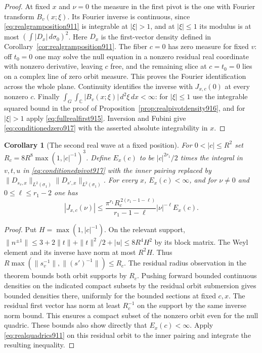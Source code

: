\documentclass[a4paper,11pt]{article}
\newtheorem{corollary}[proposition]{Corollary}
\theoremstyle{definition}
\theoremstyle{remark}
\numberwithin{equation}{section}
\begin{document}
\begin{proof}
At fixed \(x\) and \(\nu=0\) the measure in the first pivot
is the one with Fourier transform \(B_v(x;\xi)\). Its
Fourier inverse is continuous, since \eqref{eq:realgramposition911}
is integrable at \(|\xi|>1\), and at \(|\xi|\le1\) its
modulus is at most \((\int |D_x|\,d\sigma_0)^2\).
Here \(D_x\) is the first-vector density defined in
Corollary~\ref{cor:realgramposition911}. The fiber \(c=0\)
has zero measure for fixed \(v\): off \(t_0=0\) one may
solve the null equation in a nonzero residual real coordinate
with nonzero derivative, leaving \(c\) free, and the remaining
slice at \(c=t_0=0\) lies on a complex line of zero orbit
measure. This proves the Fourier identification across the
whole plane. Continuity identifies the inverse with
\(J_{x,c}(0)\) at every nonzero \(c\). Finally
\(\int_G\int_{\mathbb C}|B_v(x;\xi)|\,d^2\xi\,dx<\infty\):
for \(|\xi|\le1\) use the integrable squared bound in the
proof of Proposition~\ref{prop:realpivotdensity916}, and for
\(|\xi|>1\) apply \eqref{eq:fullrealfirst915}. Inversion and
Fubini give \eqref{eq:conditionedzero917} with the asserted
absolute integrability in \(x\).
\end{proof}

\begin{corollary}[The second real wave at a fixed position]
\leavevmode\label{cor:conditionedwave917}
For \(0<|c|\le R^2\) set \(R_c=8R^8\max(1,|c|^{-1})^3\).
Define \(E_x(c)\) to be \(|c|^{2r_1}/2\) times the integral
in \(v,t,u\) in \eqref{eq:conditionedpivot917} with the inner
pairing replaced by
\(\|D_{s_v,x}\|_{L^2(\sigma_1)}\|D_{s',x}\|_{L^2(\sigma_1)}\).
For every \(x\), \(E_x(c)<\infty\), and for \(\nu\ne0\) and
\(0\le\ell\le r_1-2\) one has
\[
       |J_{x,c}(\nu)|\le
       \frac{\pi^{r_1}R_c^{\,2(r_1-1-\ell)}}{r_1-1-\ell}
                    |\nu|^{-\ell}E_x(c).
\]
\end{corollary}
\begin{proof}
Put \(H=\max(1,|c|^{-1})\). On the relevant support,
\(\|n^{\pm1}\|\le 3+2\|t\|+\|t\|^2/2+|u|
                  \le 8R^4H^2\)
by its block matrix. The Weyl element and its inverse have
norm at most \(R^2H\). Thus
\(R\max(\|s_v^{-1}\|,\|(s')^{-1}\|)\le R_c\).
The residual radius observation in the theorem bounds both
orbit supports by \(R_c\). Pushing forward bounded continuous
densities on the indicated compact subsets by the residual
orbit submersion gives bounded densities there, uniformly
for the bounded sections at fixed \(c,x\). The residual
first vector has norm at least \(R_c^{-1}\) on the support
by the same inverse norm bound. This ensures a compact
subset of the nonzero orbit even for the null quadric.
These bounds also show directly that \(E_x(c)<\infty\).
Apply \eqref{eq:realquadrics911} on this residual orbit to
the inner pairing and integrate the resulting inequality.
\end{proof}
\end{document}
